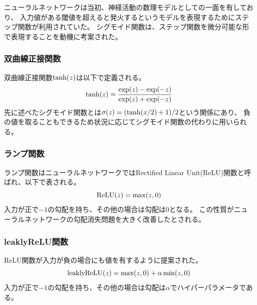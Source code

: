 ニューラルネットワークは当初、神経活動の数理モデルとしての一面を有しており、
入力値がある閾値を超えると発火するというモデルを表現するためにステップ関数が利用されていた。
シグモイド関数は、ステップ関数を微分可能な形で表現することを動機に考案された。

\subsubsection{双曲線正接関数}
双曲線正接関数\({\rm tanh}(z)\)は以下で定義される。
\begin{equation}
    {\rm tanh}(z) = \frac{\exp(z) - \exp(-z)}{\exp(z)+\exp(-z)}
\end{equation}
先に述べたシグモイド関数とは\(\sigma(z)=({\rm tanh}(x/2) + 1)/2\)という関係にあり、
負の値を取ることもできるため状況に応じてシグモイド関数の代わりに用いられる。

\subsubsection{ランプ関数}
ランプ関数はニューラルネットワークではRectified Linear Unit(ReLU)関数と呼ばれ、以下で表される。
\begin{equation}
    {\rm ReLU}(z) = \max(z,0)
\end{equation}
入力が正で\(-1\)の勾配を持ち、その他の場合は勾配は\(0\)となる。
この性質がニューラルネットワークの勾配消失問題を大きく改善したとされる。

\subsubsection{leaklyReLU関数}
ReLU関数が入力が負の場合にも値を有するように提案された。
\begin{equation}
    {\rm leaklyReLU}(z) = \max(z,0) + \alpha \min(z,0)
\end{equation}
入力が正で\(-1\)の勾配を持ち、その他の場合は勾配は\(\alpha\)でハイパーパラメータである。

